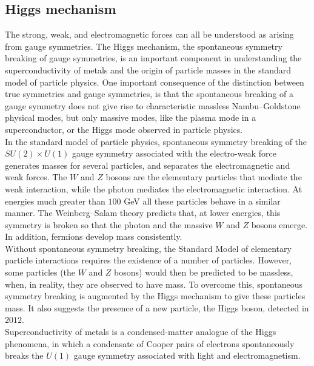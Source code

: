 \subsection{Higgs mechanism}
\label{subsec:higgs}
The strong, weak, and electromagnetic forces can all be understood as arising from gauge symmetries. The Higgs mechanism, the spontaneous symmetry breaking of gauge symmetries, is an important component in understanding the superconductivity of metals and the origin of particle masses in the standard model of particle physics. One important consequence of the distinction between true symmetries and gauge symmetries, is that the spontaneous breaking of a gauge symmetry does not give rise to characteristic massless Nambu–Goldstone physical modes, but only massive modes, like the plasma mode in a superconductor, or the Higgs mode observed in particle physics.\\
In the standard model of particle physics, spontaneous symmetry breaking of the $SU(2) \times U(1)$ gauge symmetry associated with the electro-weak force generates masses for several particles, and separates the electromagnetic and weak forces. The $W$ and $Z$ bosons are the elementary particles that mediate the weak interaction, while the photon mediates the electromagnetic interaction. At energies much greater than $100$ GeV all these particles behave in a similar manner. The Weinberg–Salam theory predicts that, at lower energies, this symmetry is broken so that the photon and the massive $W$ and $Z$ bosons emerge. In addition, fermions develop mass consistently.\\
Without spontaneous symmetry breaking, the Standard Model of elementary particle interactions requires the existence of a number of particles. However, some particles (the $W$ and $Z$ bosons) would then be predicted to be massless, when, in reality, they are observed to have mass. To overcome this, spontaneous symmetry breaking is augmented by the Higgs mechanism to give these particles mass. It also suggests the presence of a new particle, the Higgs boson, detected in $2012$.\\
Superconductivity of metals is a condensed-matter analogue of the Higgs phenomena, in which a condensate of Cooper pairs of electrons spontaneously breaks the $U(1)$ gauge symmetry associated with light and electromagnetism.
